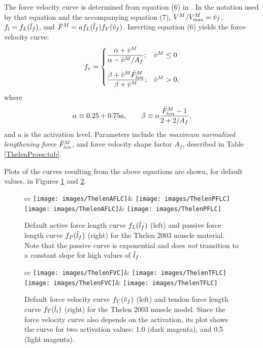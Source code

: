 The force velocity curve is determined from equation (6)
in \cite{thelen2003adjustment}. In the notation used by that equation
and the accompanying equation (7), $V^M/V^M_\text{max} = \hat{v}_f$, $f_l =
f_L(\hat{l}_f)$, and $\bar F^M = a f_L(\hat{l}_f) f_V(\hat{v}_f)$. Inverting equation
(6) yields the force velocity curve:
%
\begin{equation*}
f_v = 
\begin{cases}
\dfrac {\alpha + \bar{v}^M}{\alpha -\bar{v}^M/A_f}; & \bar{v}^M \le 0 \\[1.5em]
\dfrac {\beta + \bar{v}^M \bar{F}^M_{len}}{\beta + \bar{v}^M}; 
& \bar{v}^M > 0,
\end{cases}
\label{fv:eqn}
\end{equation*}
%
where
%
\begin{equation*}
\alpha \equiv 0.25 + 0.75 a, \qquad 
\beta \equiv \alpha \frac{\bar{F}^M_{len} - 1}{2 + 2/A_f},
\end{equation*}
%
and $a$ is the activation level. Parameters include the {\it maximum
normalized lengthening force} $\bar{F}^M_{len}$, and force velocity shape factor
$A_f$, described in Table \ref{ThelenProps:tab}.

Plots of the curves resulting from the above equations are shown, for
default values, in Figures \ref{ThelenCurvesA:fig}
and \ref{ThelenCurvesB:fig}.

\begin{figure}[ht]
\begin{center}
\begin{tabular}{cc}
   \iflatexml
      \texttt{[image: images/ThelenAFLC]}&
      \texttt{[image: images/ThelenPFLC]}
   \else
      \texttt{[image: images/ThelenAFLC]}&
      \texttt{[image: images/ThelenPFLC]}
   \fi
\end{tabular}
\end{center}
\caption{Default active force length curve $f_L(\hat{l}_f)$ (left) and 
passive force length curve $f_P(\hat{l}_f)$ (right) for the Thelen 2003
muscle material. Note that the passive curve is exponential and does
{\it not} transition to a constant slope for high values of $\hat{l}_f$.}
\label{ThelenCurvesA:fig}
\end{figure}

\begin{figure}[ht]
\begin{center}
\begin{tabular}{cc}
   \iflatexml
      \texttt{[image: images/ThelenFVC]}&
      \texttt{[image: images/ThelenTFLC]}
   \else
      \texttt{[image: images/ThelenFVC]}&
      \texttt{[image: images/ThelenTFLC]}
   \fi
\end{tabular}
\end{center}
\caption{Default force velocity curve $f_V(\hat{v}_f)$ (left) and tendon
force length curve $f_T(\hat{l}_t)$ (right) for the Thelen 2003 muscle
model. Since the force velocity curve also depends on the activation,
its plot shows the curve for two activation values: 1.0 (dark
magenta), and 0.5 (light magenta).}
\label{ThelenCurvesB:fig}
\end{figure}

